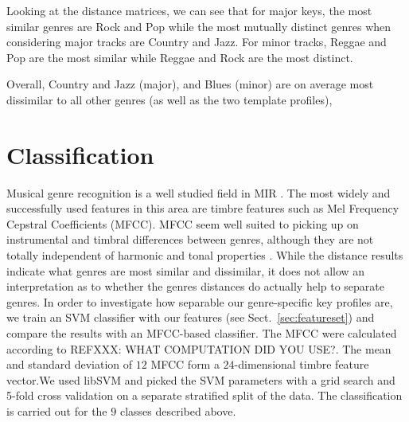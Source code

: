 \documentclass{article}
\begin{document}
Looking at the distance matrices, we can see that for major keys, the most similar genres are Rock and Pop while the most mutually distinct genres when considering major tracks are Country and Jazz. For minor tracks, Reggae and Pop are the most similar while Reggae and Rock are the most distinct.

Overall, Country and Jazz (major), and Blues (minor) are on average most dissimilar to all other genres (as well as the two template profiles), 

\section{Classification}
Musical genre recognition is a well studied field in MIR \cite{fu_survey_2011}. The most widely and successfully used features in this area are timbre features such as Mel Frequency Cepstral Coefficients (MFCC). MFCC seem well suited to picking up on instrumental and timbral differences between genres, although they are not totally independent of harmonic and tonal properties \cite{li_genre_2011}.
While the distance results indicate what genres are most similar and dissimilar, it does not allow an interpretation as to whether the genres distances do actually help to separate genres. In order to investigate how separable  our genre-specific key profiles are, we train an SVM classifier with our features (see Sect.~\ref{sec:featureset}) and compare the results with an MFCC-based classifier. The MFCC were calculated according to REFXXX: WHAT COMPUTATION DID YOU USE?. The mean and standard deviation of $12$ MFCC form a $24$-dimensional timbre feature vector.We used libSVM  \cite{chang_libsvm:_2011} and picked the SVM parameters with a grid search and 5-fold cross validation on a separate stratified split of the data. The classification is carried out for the $9$ classes described above.
\end{document}

